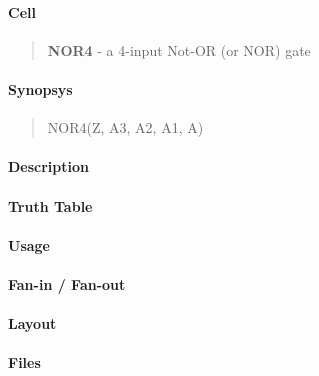 \label{NOR4}
\paragraph{Cell}
\begin{quote}
    \textbf{NOR4} - a 4-input Not-OR (or NOR) gate
\end{quote}

\paragraph{Synopsys}
\begin{quote}
    NOR4(Z, A3, A2, A1, A)
\end{quote}

\paragraph{Description}

%

\paragraph{Truth Table}
%

\paragraph{Usage}

\paragraph{Fan-in / Fan-out}

\paragraph{Layout}

\paragraph{Files}
